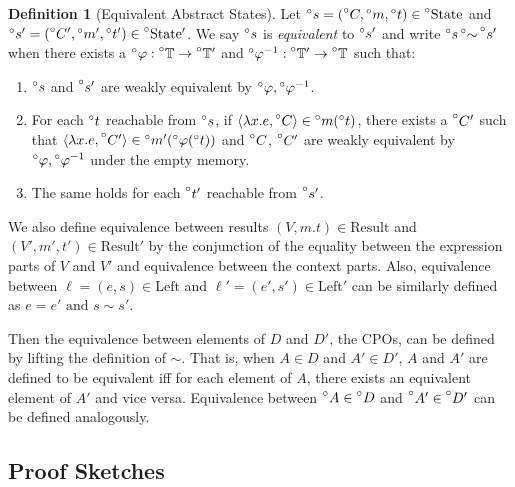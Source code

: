 \documentclass{article}
\theoremstyle{definition}
\newtheorem{definition}{Definition}[section]
\newcommand*{\A}[1]{\prescript{\circ}{}{#1}}
\newcommand*{\Time}{\mathbb{T}}
\newcommand*{\ATime}{\A{\Time}}
\newcommand*{\Left}{\text{Left}}
\newcommand*{\mem}{m}
\newcommand*{\AState}{\A{\text{State}}}
\newcommand*{\Result}{\text{Result}}
\newcommand*{\equivalent}{\sim}
\begin{document}
\begin{definition}[Equivalent Abstract States]
  Let $\A{s}=(\A{C},\A\mem,\A{t})\in\AState$ and $\A{s}'=(\A{C}',\A\mem',\A{t}')\in\AState'$.
  We say $\A{s}$ is \emph{equivalent} to $\A{s}'$ and write $\A{s}\A\equivalent\A{s'}$ when there exists a $\A\varphi:\ATime\rightarrow\ATime'$ and $\A\varphi^{-1}:\ATime'\rightarrow\ATime$ such that:
  \begin{enumerate}
    \item $\A{s}$ and $\A{s'}$ are weakly equivalent by $\A\varphi,\A\varphi^{-1}$.
    \item For each $\A{t}$ reachable from $\A{s}$, if $\langle\lambda x.e,\A{C}\rangle\in\A\mem(\A{t})$, there exists a $\A{C'}$ such that $\langle\lambda x.e,\A{C'}\rangle\in\A\mem'(\A\varphi(\A{t}))$ and $\A{C}$, $\A{C'}$ are weakly equivalent by $\A\varphi,\A\varphi^{-1}$ under the empty memory.
    \item The same holds for each $\A{t'}$ reachable from $\A{s'}$.
  \end{enumerate}
\end{definition}

We also define equivalence between results $(V,\mem.t)\in\Result$ and $(V',\mem',t')\in\Result'$ by the conjunction of the equality between the expression parts of $V$ and $V'$ and equivalence between the context parts.
Also, equivalence between $\ell=(e,s)\in\Left$ and $\ell'=(e',s')\in\Left'$ can be similarly defined as $e=e'\text{ and } s\equivalent s'$.

Then the equivalence between elements of $D$ and $D'$, the CPOs, can be defined by lifting the definition of $\equivalent$.
That is, when $A\in D$ and $A'\in D'$, $A$ and $A'$ are defined to be equivalent iff for each element of $A$, there exists an equivalent element of $A'$ and vice versa.
Equivalence between $\A{A}\in\A{D}$ and $\A{A'}\in\A{D'}$ can be defined analogously.
\subsection{Proof Sketches}
\end{document}
